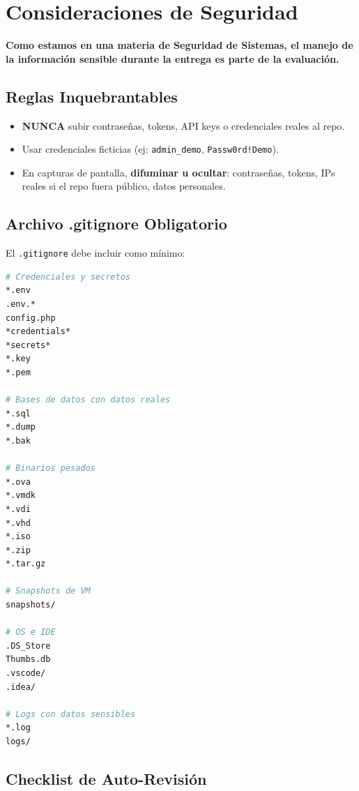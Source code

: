 \documentclass[11pt,a4paper]{article}
\begin{document}
\section{Consideraciones de Seguridad}

\begin{warningbox}
\textbf{Como estamos en una materia de Seguridad de Sistemas, el manejo de la información sensible durante la entrega es \textbf{parte de la evaluación}.}
\end{warningbox}

\subsection{Reglas Inquebrantables}

\begin{itemize}
    \item \textbf{NUNCA} subir contraseñas, tokens, API keys o credenciales reales al repo.
    \item Usar credenciales ficticias (ej: \texttt{admin\_demo}, \texttt{Passw0rd!Demo}).
    \item En capturas de pantalla, \textbf{difuminar u ocultar}: contraseñas, tokens, IPs reales si el repo fuera público, datos personales.
\end{itemize}

\subsection{Archivo .gitignore Obligatorio}

El \texttt{.gitignore} debe incluir como mínimo:

\begin{lstlisting}[language=bash, caption=.gitignore recomendado]
# Credenciales y secretos
*.env
.env.*
config.php
*credentials*
*secrets*
*.key
*.pem

# Bases de datos con datos reales
*.sql
*.dump
*.bak

# Binarios pesados
*.ova
*.vmdk
*.vdi
*.vhd
*.iso
*.zip
*.tar.gz

# Snapshots de VM
snapshots/

# OS e IDE
.DS_Store
Thumbs.db
.vscode/
.idea/

# Logs con datos sensibles
*.log
logs/
\end{lstlisting}

\subsection{Checklist de Auto-Revisión}
\end{document}
